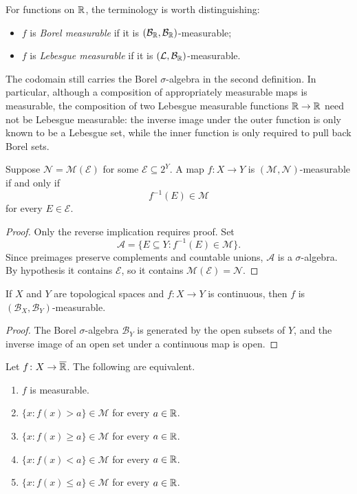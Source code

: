For functions on $\mathbb{R}$, the terminology is worth distinguishing:
\begin{itemize}
  \item $f$ is \emph{Borel measurable} if it is
    $(\mathcal B_{\mathbb{R}},\mathcal B_{\mathbb{R}})$-measurable;
  \item $f$ is \emph{Lebesgue measurable} if it is
    $(\mathcal L,\mathcal B_{\mathbb{R}})$-measurable.
\end{itemize}
The codomain still carries the Borel $\sigma$-algebra in the second
definition. In particular, although a composition of appropriately
measurable maps is measurable, the composition of two Lebesgue
measurable functions $\mathbb{R}\to\mathbb{R}$ need not be Lebesgue measurable:
the inverse image under the outer function is only known to be a
Lebesgue set, while the inner function is only required to pull back
Borel sets.

\begin{lemma}
  \label{lem:measurability-generators-sep-15}
  Suppose $\mathcal N=\mathcal M(\mathcal E)$ for some
  $\mathcal E\subseteq2^Y$. A map $f\colon X\to Y$ is
  $(\mathcal M,\mathcal N)$-measurable if and only if
  \[
    f^{-1}(E)\in\mathcal M
  \]
  for every $E\in\mathcal E$.
\end{lemma}

\begin{proof}
  Only the reverse implication requires proof. Set
  \[
    \mathcal A
    =\{E\subseteq Y:f^{-1}(E)\in\mathcal M\}.
  \]
  Since preimages preserve complements and countable unions,
  $\mathcal A$ is a $\sigma$-algebra. By hypothesis it contains
  $\mathcal E$, so it contains
  $\mathcal M(\mathcal E)=\mathcal N$.
\end{proof}

\begin{corollary}
  If $X$ and $Y$ are topological spaces and
  $f\colon X\to Y$ is continuous, then $f$ is
  $(\mathcal B_X,\mathcal B_Y)$-measurable.
\end{corollary}

\begin{proof}
  The Borel $\sigma$-algebra $\mathcal B_Y$ is generated by the open
  subsets of $Y$, and the inverse image of an open set under a
  continuous map is open.
\end{proof}

\begin{proposition}
  \label{prop:half-line-measurability-sep-15}
  Let $f\colon X\to\overline{\mathbb{R}}$. The following are equivalent.
  \begin{enumerate}[label=(\roman*)]
    \item $f$ is measurable.
    \item $\{x:f(x)>a\}\in\mathcal M$ for every $a\in\mathbb{R}$.
    \item $\{x:f(x)\geq a\}\in\mathcal M$ for every $a\in\mathbb{R}$.
    \item $\{x:f(x)<a\}\in\mathcal M$ for every $a\in\mathbb{R}$.
    \item $\{x:f(x)\leq a\}\in\mathcal M$ for every $a\in\mathbb{R}$.
  \end{enumerate}
\end{proposition}

